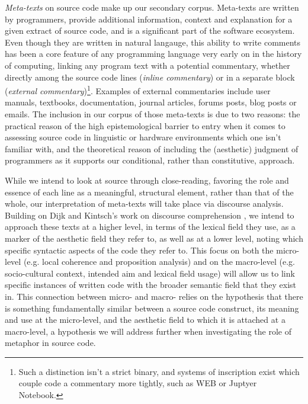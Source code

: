 \emph{Meta-texts} on source code make up our secondary corpus. Meta-texts are written by programmers, provide additional information, context and explanation for a given extract of source code, and is a significant part of the software ecosystem. Even though they are written in natural langauge, this ability to write comments has been a core feature of any programming language very early on in the history of computing, linking any program text with a potential commentary, whether directly among the source code lines (\emph{inline commentary}) or in a separate block (\emph{external commentary})\footnote{Such a distinction isn't a strict binary, and systems of inscription exist which couple code a commentary more tightly, such as WEB or Juptyer Notebook.}. Examples of external commentaries include user manuals, textbooks, documentation, journal articles, forums posts, blog posts or emails. The inclusion in our corpus of those meta-texts is due to two reasons: the practical reason of the high epistemological barrier to entry when it comes to assessing source code in linguistic or hardware environments which one isn't familiar with, and the theoretical reason of including the (aesthetic) judgment of programmers as it supports our conditional, rather than constitutive, approach.

While we intend to look at source through close-reading, favoring the role and essence of each line as a meaningful, structural element, rather than that of the whole, our interpretation of meta-texts will take place via discourse analysis. Building on Dijk and Kintsch's work on discourse comprehension \citep{dijk_strategies_1983}, we intend to approach these texts at a higher level, in terms of the lexical field they use, as a marker of the aesthetic field they refer to, as well as at a lower level, noting which specific syntactic aspects of the code they refer to. This focus on both the micro-level (e.g. local coherence and proposition analysis) and on the macro-level (e.g. socio-cultural context, intended aim and  lexical field usage) will allow us to link specific instances of written code with the broader semantic field that they exist in. This connection between micro- and macro- relies on the hypothesis that there is something fundamentally similar between a source code construct, its meaning and use at the micro-level, and the aesthetic field to which it is attached at a macro-level, a hypothesis we will address further when investigating the role of metaphor in source code.

